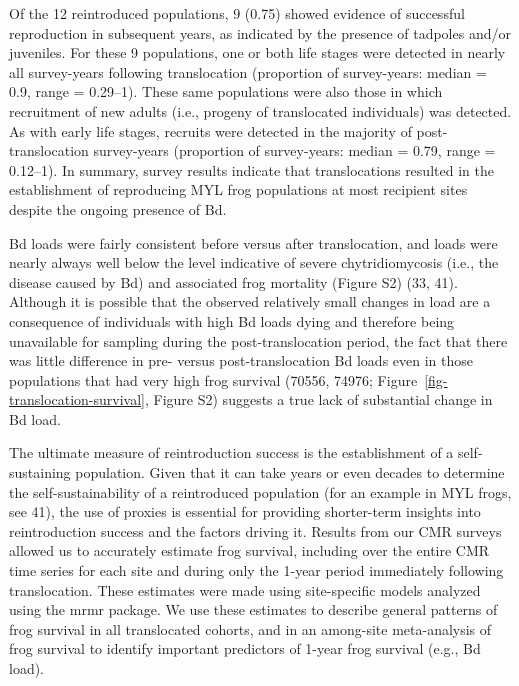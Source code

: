 \documentclass[9pt,twocolumn,twoside,lineno]{pnas-new}
\begin{document}
Of the 12 reintroduced populations, 9 (0.75) showed evidence of
successful reproduction in subsequent years, as indicated by the
presence of tadpoles and/or juveniles. For these 9 populations, one or
both life stages were detected in nearly all survey-years following
translocation (proportion of survey-years: median = 0.9, range =
0.29--1). These same populations were also those in which recruitment of
new adults (i.e., progeny of translocated individuals) was detected. As
with early life stages, recruits were detected in the majority of
post-translocation survey-years (proportion of survey-years: median =
0.79, range = 0.12--1). In summary, survey results indicate that
translocations resulted in the establishment of reproducing MYL frog
populations at most recipient sites despite the ongoing presence of Bd.

Bd loads were fairly consistent before versus after translocation, and
loads were nearly always well below the level indicative of severe
chytridiomycosis (i.e., the disease caused by Bd) and associated frog
mortality (Figure S2) (33, 41). Although it
is possible that the observed relatively small changes in load are a
consequence of individuals with high Bd loads dying and therefore being
unavailable for sampling during the post-translocation period, the fact
that there was little difference in pre- versus post-translocation Bd
loads even in those populations that had very high frog survival (70556,
74976; Figure~\ref{fig-translocation-survival},
Figure S2) suggests a true lack of
substantial change in Bd load.

The ultimate measure of reintroduction success is the establishment of a
self-sustaining population. Given that it can take years or even decades
to determine the self-sustainability of a reintroduced population (for
an example in MYL frogs, see 41), the use of proxies is essential for
providing shorter-term insights into reintroduction success and the
factors driving it. Results from our CMR surveys allowed us to
accurately estimate frog survival, including over the entire CMR time
series for each site and during only the 1-year period immediately
following translocation. These estimates were made using site-specific
models analyzed using the mrmr package. We use these estimates to
describe general patterns of frog survival in all translocated cohorts,
and in an among-site meta-analysis of frog survival to identify
important predictors of 1-year frog survival (e.g., Bd load).
\end{document}
